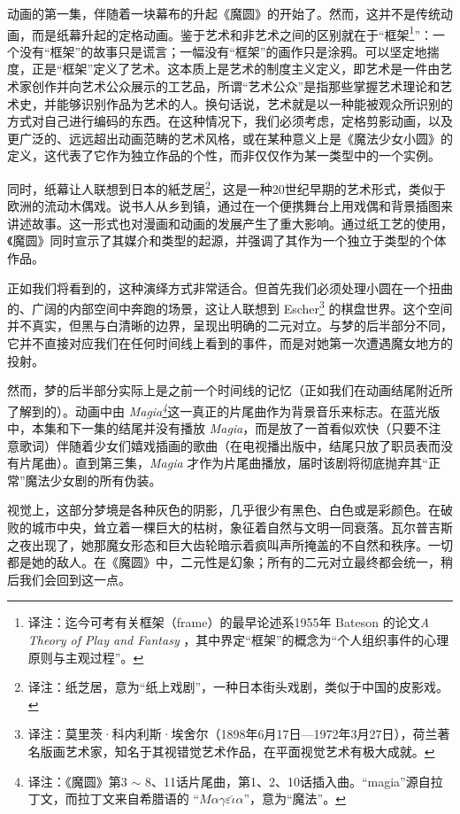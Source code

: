 动画的第一集，伴随着一块幕布的升起《魔圆》的开始了。然而，这并不是传统动画，而是纸幕升起的定格动画。鉴于艺术和非艺术之间的区别就在于“框架\footnote{译注：迄今可考有关框架（frame）的最早论述系1955年 Bateson 的论文\emph{A Theory of Play and Fantasy} ，其中界定“框架”的概念为“个人组织事件的心理原则与主观过程”。}”：一个没有“框架”的故事只是谎言；一幅没有“框架”的画作只是涂鸦。可以坚定地揣度，正是“框架”定义了艺术。这本质上是艺术的制度主义定义，即艺术是一件由艺术家创作并向艺术公众展示的工艺品，所谓“艺术公众”是指那些掌握艺术理论和艺术史，并能够识别作品为艺术的人\cite{ref9}。换句话说，艺术就是以一种能被观众所识别的方式对自己进行编码的东西。在这种情况下，我们必须考虑，定格剪影动画，以及更广泛的、远远超出动画范畴的艺术风格，或在某种意义上是《魔法少女小圆》的定义，这代表了它作为独立作品的个性，而非仅仅作为某一类型中的一个实例。

同时，纸幕让人联想到日本的紙芝居\footnote{译注：纸芝居，意为“纸上戏剧”，一种日本街头戏剧，类似于中国的皮影戏。}，这是一种20世纪早期的艺术形式，类似于欧洲的流动木偶戏。说书人从乡到镇，通过在一个便携舞台上用戏偶和背景插图来讲述故事\cite{ref10}。这一形式也对漫画和动画的发展产生了重大影响\cite{ref10}。通过纸工艺的使用，《魔圆》同时宣示了其媒介和类型的起源，并强调了其作为一个独立于类型的个体作品。

正如我们将看到的，这种演绎方式非常适合。但首先我们必须处理小圆在一个扭曲的、广阔的内部空间中奔跑的场景，这让人联想到 Escher\footnote{译注：莫里茨·科内利斯·埃舍尔（1898年6月17日—1972年3月27日），荷兰著名版画艺术家，知名于其视错觉艺术作品，在平面视觉艺术有极大成就。} 的棋盘世界。这个空间并不真实，但黑与白清晰的边界，呈现出明确的二元对立。与梦的后半部分不同，它并不直接对应我们在任何时间线上看到的事件，而是对她第一次遭遇魔女地方的投射。

然而，梦的后半部分实际上是之前一个时间线的记忆（正如我们在动画结尾附近所了解到的）。动画中由 \emph{Magia\footnote{译注：《魔圆》第3 $\sim$ 8、11话片尾曲，第1、2、10话插入曲。``magia''源自拉丁文，而拉丁文来自希腊语的 ``$M\alpha\gamma\varepsilon\acute{\iota}\alpha$''，意为“魔法”。}}这一真正的片尾曲作为背景音乐来标志。在蓝光版中，本集和下一集的结尾并没有播放 \emph{Magia}，而是放了一首看似欢快（只要不注意歌词）伴随着少女们嬉戏插画的歌曲（在电视播出版中，结尾只放了职员表而没有片尾曲）。直到第三集，\emph{Magia} 才作为片尾曲播放，届时该剧将彻底抛弃其“正常”魔法少女剧的所有伪装。

视觉上，这部分梦境是各种灰色的阴影，几乎很少有黑色、白色或是彩颜色。在破败的城市中央，耸立着一棵巨大的枯树，象征着自然与文明一同衰落。瓦尔普吉斯之夜出现了，她那魔女形态和巨大齿轮暗示着疯叫声所掩盖的不自然和秩序。一切都是她的敌人。在《魔圆》中，二元性是幻象；所有的二元对立最终都会统一，稍后我们会回到这一点。

